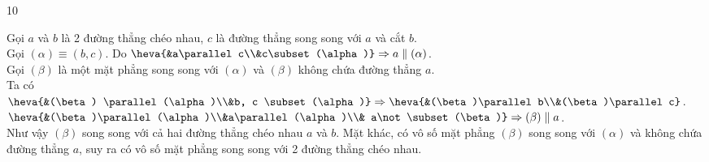 \begin{indapan}{10}
\begin{ex}
{\begin{center}
        \end{center}
        Gọi $a$ và $b$ là 2 đường thẳng chéo nhau, $c$ là đường thẳng song song với $a$ và cắt $b$.\\
        Gọi $(\alpha) \equiv(b, c)$. Do $\heva{&a\parallel c\\&c\subset (\alpha)}\Rightarrow a \parallel (\alpha)$.\\
        Gọi $(\beta)$ là một mặt phẳng song song với $(\alpha)$  và $(\beta)$ không chứa đường thẳng $a$. \\
        Ta có $\heva{&(\beta) \parallel (\alpha)\\&b, c \subset (\alpha)} \Rightarrow \heva{&(\beta)\parallel b\\&(\beta)\parallel c}$.\\
        $\heva{&(\beta)\parallel (\alpha)\\&a\parallel (\alpha)\\& a\not \subset (\beta)}\Rightarrow (\beta)\parallel a$.\\
        Như vậy $(\beta)$ song song với cả hai đường thẳng chéo nhau $a$ và $b$. Mặt khác, có vô số mặt phẳng $(\beta)$ song song với $(\alpha)$ và không chứa đường thẳng $a$, suy ra có vô số mặt phẳng song song với 2 đường thẳng chéo nhau.
    }
\end{ex}


\end{indapan}
